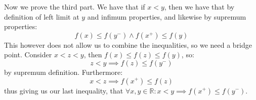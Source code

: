 \documentclass[10pt,letterpaper]{article} %
\begin{document}
Now we prove the third part. We have that if $x < y$, then we have that by definition of left limit at $y$ and infimum properties, and likewise by supremum properties:
\begin{equation*}
f(x) \leqslant f(y^-) \land f(x^+) \leqslant f(y)
\end{equation*}
This however does not allow us to combine the inequalities, so we need a bridge point. Consider $x < z < y$, then $f(x) \leqslant f(z) \leqslant f(y)$, so:
\begin{equation*}
z < y \implies f(z) \leqslant f(y^-)
\end{equation*}
by supremum definition. Furthermore:
\begin{equation*}
x < z \implies f(x^+) \leqslant f(z)
\end{equation*}
thus giving us our last inequality, that $\forall x, y \in \mathbb{R}: x < y \implies f(x^+) \leqslant f(y^-)$.




\end{document}
